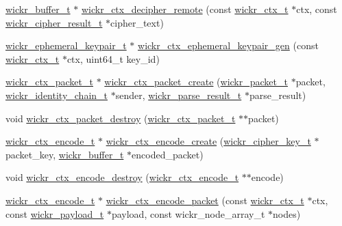 \begin{DoxyCompactItemize}
\item 
\mbox{\hyperlink{structwickr__buffer}{wickr\+\_\+buffer\+\_\+t}} $\ast$ \mbox{\hyperlink{group__wickr__ctx_gacc1038d3690ba4860b74f13239c65600}{wickr\+\_\+ctx\+\_\+decipher\+\_\+remote}} (const \mbox{\hyperlink{structwickr__ctx}{wickr\+\_\+ctx\+\_\+t}} $\ast$ctx, const \mbox{\hyperlink{structwickr__cipher__result}{wickr\+\_\+cipher\+\_\+result\+\_\+t}} $\ast$cipher\+\_\+text)
\item 
\mbox{\hyperlink{structwickr__ephemeral__keypair}{wickr\+\_\+ephemeral\+\_\+keypair\+\_\+t}} $\ast$ \mbox{\hyperlink{group__wickr__ctx_ga45b2531085c430942122dcbf45736e10}{wickr\+\_\+ctx\+\_\+ephemeral\+\_\+keypair\+\_\+gen}} (const \mbox{\hyperlink{structwickr__ctx}{wickr\+\_\+ctx\+\_\+t}} $\ast$ctx, uint64\+\_\+t key\+\_\+id)
\item 
\mbox{\hyperlink{structwickr__ctx__packet}{wickr\+\_\+ctx\+\_\+packet\+\_\+t}} $\ast$ \mbox{\hyperlink{group__wickr__ctx_ga8ac1e1c9a0b9802d7f259278a09df56c}{wickr\+\_\+ctx\+\_\+packet\+\_\+create}} (\mbox{\hyperlink{structwickr__packet}{wickr\+\_\+packet\+\_\+t}} $\ast$packet, \mbox{\hyperlink{structwickr__identity__chain}{wickr\+\_\+identity\+\_\+chain\+\_\+t}} $\ast$sender, \mbox{\hyperlink{structwickr__parse__result}{wickr\+\_\+parse\+\_\+result\+\_\+t}} $\ast$parse\+\_\+result)
\item 
void \mbox{\hyperlink{group__wickr__ctx_gad7063bcfca4878d290e598ed6bc22e3c}{wickr\+\_\+ctx\+\_\+packet\+\_\+destroy}} (\mbox{\hyperlink{structwickr__ctx__packet}{wickr\+\_\+ctx\+\_\+packet\+\_\+t}} $\ast$$\ast$packet)
\item 
\mbox{\hyperlink{structwickr__ctx__encode}{wickr\+\_\+ctx\+\_\+encode\+\_\+t}} $\ast$ \mbox{\hyperlink{group__wickr__ctx_ga810ee459cb0ab1037b5fd1f983d0ded3}{wickr\+\_\+ctx\+\_\+encode\+\_\+create}} (\mbox{\hyperlink{structwickr__cipher__key}{wickr\+\_\+cipher\+\_\+key\+\_\+t}} $\ast$packet\+\_\+key, \mbox{\hyperlink{structwickr__buffer}{wickr\+\_\+buffer\+\_\+t}} $\ast$encoded\+\_\+packet)
\item 
void \mbox{\hyperlink{group__wickr__ctx_ga9ed3f7c0f4d672a2ac562b279e2da4e1}{wickr\+\_\+ctx\+\_\+encode\+\_\+destroy}} (\mbox{\hyperlink{structwickr__ctx__encode}{wickr\+\_\+ctx\+\_\+encode\+\_\+t}} $\ast$$\ast$encode)
\item 
\mbox{\hyperlink{structwickr__ctx__encode}{wickr\+\_\+ctx\+\_\+encode\+\_\+t}} $\ast$ \mbox{\hyperlink{group__wickr__ctx_ga3766720fd6654fad791a26cd2c1161b7}{wickr\+\_\+ctx\+\_\+encode\+\_\+packet}} (const \mbox{\hyperlink{structwickr__ctx}{wickr\+\_\+ctx\+\_\+t}} $\ast$ctx, const \mbox{\hyperlink{structwickr__payload}{wickr\+\_\+payload\+\_\+t}} $\ast$payload, const wickr\+\_\+node\+\_\+array\+\_\+t $\ast$nodes)

\end{DoxyCompactItemize}
